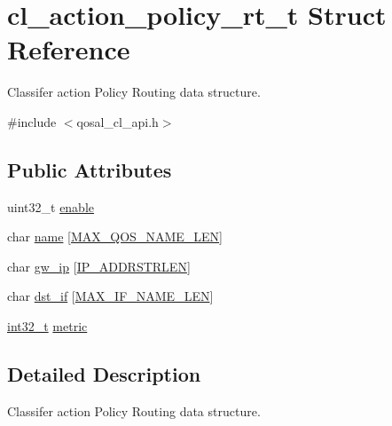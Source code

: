 \hypertarget{structcl__action__policy__rt__t}{\section{cl\-\_\-action\-\_\-policy\-\_\-rt\-\_\-t Struct Reference}
\label{structcl__action__policy__rt__t}
}


Classifer action Policy Routing data structure.  




{\ttfamily \#include $<$qosal\-\_\-cl\-\_\-api.\-h$>$}

\subsection*{Public Attributes}
\begin{DoxyCompactItemize}
\item 
uint32\-\_\-t \hyperlink{structcl__action__policy__rt__t_ae40238d575958ca5624f67fffc5bda51}{enable}
\item 
char \hyperlink{structcl__action__policy__rt__t_ad03f755c9640e2ac211250c92bef5472}{name} \mbox{[}\hyperlink{group__FAPI__QOS__CLASS_gacbdea39cbf4ab5d35d49219652c30987}{M\-A\-X\-\_\-\-Q\-O\-S\-\_\-\-N\-A\-M\-E\-\_\-\-L\-E\-N}\mbox{]}
\item 
char \hyperlink{structcl__action__policy__rt__t_a31b6fdbc2d494bd6776d8c82db845494}{gw\-\_\-ip} \mbox{[}\hyperlink{group__FAPI__QOS__CLASS_ga684323e1ca3c7464366255d8ab239c18}{I\-P\-\_\-\-A\-D\-D\-R\-S\-T\-R\-L\-E\-N}\mbox{]}
\item 
char \hyperlink{structcl__action__policy__rt__t_a6aa2133efd09dc7436c3841411995593}{dst\-\_\-if} \mbox{[}\hyperlink{group__FAPI__QOS__GENERAL_ga53a5c7c867e818bc8b6dea3105a90f62}{M\-A\-X\-\_\-\-I\-F\-\_\-\-N\-A\-M\-E\-\_\-\-L\-E\-N}\mbox{]}
\item 
\hyperlink{commondefs_8h_a32f2e37ee053cf2ce8ca28d1f74630e5}{int32\-\_\-t} \hyperlink{structcl__action__policy__rt__t_ada9b7857102fc1d05857d0cb0a066656}{metric}
\end{DoxyCompactItemize}


\subsection{Detailed Description}
Classifer action Policy Routing data structure. 

